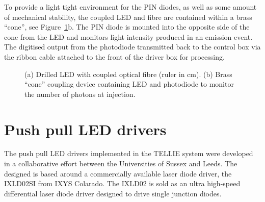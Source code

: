 \documentclass[12pt]{report}
\begin{document}
To provide a light tight environment for the PIN diodes, as well as some amount of mechanical stability, the coupled LED and fibre are contained within a brass ``cone'', see Figure~\ref{fig:LEDCoupling}b. The PIN diode is mounted into the opposite side of the cone from the LED and monitors light intensity produced in an emission event. The digitised output from the photodiode transmitted back to the control box via the ribbon cable attached to the front of the driver box for processing. 

\begin{figure}
	\centering
	\caption{(a) Drilled LED with coupled optical fibre (ruler in cm). (b) Brass ``cone'' coupling device containing LED and photodiode to monitor the number of photons at injection.}
	\label{fig:LEDCoupling} 
\end{figure}


\section{Push pull LED drivers}
\label{sec:LEDdrivers}
The push pull LED drivers implemented in the TELLIE system were developed in a collaborative effort between the Universities of Sussex and Leeds. The designed is based around a commercially available laser diode driver, the IXLD02SI from IXYS Colarado. The IXLD02 is sold as an ultra high-speed differential laser diode driver designed to drive single junction diodes. 
\end{document}
